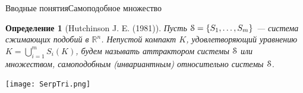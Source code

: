 \documentclass[aspectratio=1610, 10pt, notheorems]{beamer}
\newtheorem{definition}  {Определение}
\begin{document}
\begin{frame}{Вводные понятия}{Самоподобное множество}
    \begin{definition}[Hutchinson J. E. (1981)]
        Пусть ${\EuScript S}=\{S_1, \ldots, S_m\}$ --- система сжимающих подобий в $\mathbb{R}^n$.  
        Непустой компакт $K$, удовлетворяющий уравнению  $K=\bigcup\limits_{i=1}^m S_i(K)$, будем называть {\em аттрактором системы} ${\EuScript S}$ или множеством, самоподобным (инвариантным) относительно системы ${\EuScript S}$.
    \end{definition}
    \begin{center}
    \texttt{[image: SerpTri.png]}
    \end{center}
\end{frame}
\end{document}
